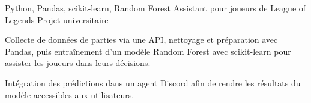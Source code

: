 
\begin{cventries}
  \cventry
    {Python, Pandas, scikit-learn, Random Forest}
    {Assistant pour joueurs de League of Legends}
    {Projet universitaire}
    {}
    {
      \begin{cvitems}
        \item {Collecte de données de parties via une API, nettoyage et préparation avec Pandas, puis entraînement d’un modèle Random Forest avec scikit-learn pour assister les joueurs dans leurs décisions.}
        \item {Intégration des prédictions dans un agent Discord afin de rendre les résultats du modèle accessibles aux utilisateurs.}
      \end{cvitems}
    }
\end{cventries}
